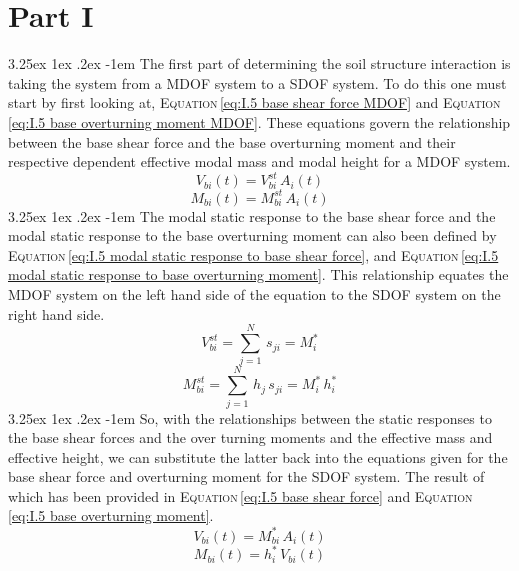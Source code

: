 \documentclass[11pt,a4paper,titlepage]{report}
\makeatletter
\renewcommand\paragraph{\@startsection{paragraph}{5}{\z@}%
  {3.25ex \@plus1ex \@minus.2ex}%
  {-1em}%
  {\normalfont\normalsize\bfseries}}
\makeatother
\begin{document}
\section{Part I}
\paragraph{}The first part of determining the soil structure interaction is taking the system from a MDOF system to a SDOF system. To do this one must start by first looking at, \textsc{Equation}\,\eqref{eq:I.5 base shear force MDOF} and \textsc{Equation}\,\eqref{eq:I.5 base overturning moment MDOF}. These equations govern the relationship between the base shear force and the base overturning moment and their respective dependent effective modal mass and modal height for a MDOF system. 
\begin{equation}
    V_{bi}(t)=V_{bi}^{st}\,A_i(t)
    \label{eq:I.5 base shear force MDOF}
\end{equation}
\begin{equation}
    M_{bi}(t)=M_{bi}^{st}\,A_i(t)
    \label{eq:I.5 base overturning moment MDOF}
\end{equation}
\paragraph{}The modal static response to the base shear force and the modal static response to the base overturning moment can also been defined by \textsc{Equation}\,\eqref{eq:I.5 modal static response to base shear force}, and \textsc{Equation}\,\eqref{eq:I.5 modal static response to base overturning moment}. This relationship equates the MDOF system on the left hand side of the equation to the SDOF system on the right hand side.
\begin{equation}
    V_{bi}^{st}=\sum^N_{j=1}\,s_{ji}=M^*_i
    \label{eq:I.5 modal static response to base shear force}
\end{equation}
\begin{equation}
    M_{bi}^{st}=\sum^N_{j=1}\,h_j\,s_{ji}=M^*_i\,h_i^*
    \label{eq:I.5 modal static response to base overturning moment}
\end{equation}
\paragraph{}So, with the relationships between the static responses to the base shear forces and the over turning moments and the effective mass and effective height, we can substitute the latter back into the equations given for the base shear force and overturning moment for the SDOF system. The result of which has been provided in \textsc{Equation}\,\eqref{eq:I.5 base shear force} and \textsc{Equation}\,\eqref{eq:I.5 base overturning moment}.
\begin{equation}
    V_{bi}(t)=M^*_{bi}\,A_i(t)
    \label{eq:I.5 base shear force}
\end{equation}
\begin{equation}
    M_{bi}(t)=h_i^*\,V_{bi}(t)
    \label{eq:I.5 base overturning moment}
\end{equation}
\end{document}
